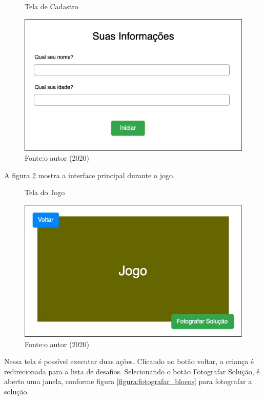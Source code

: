     \begin{figure}[h!]
        \centering
        \caption{Tela de Cadastro}
        \includegraphics[width=12cm]{images/cap3/informacoes_usuario.jpg}
        \caption*{Fonte:o autor (2020)}
        \label{figura:cadastro}
    \end{figure}
    
    A figura \ref{figura:tela_jogo} mostra a interface principal durante o jogo.
    
    \begin{figure}[h!]
        \centering
        \caption{Tela do Jogo}
        \includegraphics[width=12cm]{images/cap3/tela_jogo.jpg}
        \caption*{Fonte:o autor (2020)}
        \label{figura:tela_jogo}
    \end{figure}
    
    Nessa tela é possível executar duas ações.
    Clicando no botão voltar, a criança é redirecionada para a lista de desafios.
    Selecionando o botão Fotografar Solução, é aberto uma janela, conforme figura \ref{figura:fotografar_blocos} para fotografar a solução.
    
